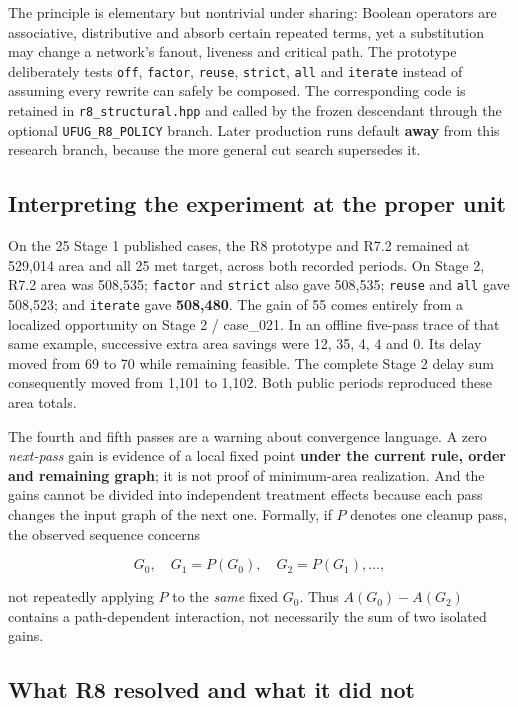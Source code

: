The principle is elementary but nontrivial under sharing: Boolean operators are associative, distributive and absorb certain repeated terms, yet a substitution may change a network's fanout, liveness and critical path. The prototype deliberately tests \texttt{off}, \texttt{factor}, \texttt{reuse}, \texttt{strict}, \texttt{all} and \texttt{iterate} instead of assuming every rewrite can safely be composed. The corresponding code is retained in \texttt{r8\_structural.hpp} and called by the frozen descendant through the optional \texttt{UFUG\_R8\_POLICY} branch. Later production runs default \textbf{away} from this research branch, because the more general cut search supersedes it.

\subsection{Interpreting the experiment at the proper unit}\label{interpreting-the-experiment-at-the-proper-unit}

On the 25 Stage 1 published cases, the R8 prototype and R7.2 remained at 529,014 area and all 25 met target, across both recorded periods. On Stage 2, R7.2 area was 508,535; \texttt{factor} and \texttt{strict} also gave 508,535; \texttt{reuse} and \texttt{all} gave 508,523; and \texttt{iterate} gave \textbf{508,480}. The gain of 55 comes entirely from a localized opportunity on Stage 2 / case\_021. In an offline five-pass trace of that same example, successive extra area savings were 12, 35, 4, 4 and 0. Its delay moved from 69 to 70 while remaining feasible. The complete Stage 2 delay sum consequently moved from 1,101 to 1,102. Both public periods reproduced these area totals.

The fourth and fifth passes are a warning about convergence language. A zero \emph{next-pass} gain is evidence of a local fixed point \textbf{under the current rule, order and remaining graph}; it is not proof of minimum-area realization. And the gains cannot be divided into independent treatment effects because each pass changes the input graph of the next one. Formally, if \(P\) denotes one cleanup pass, the observed sequence concerns

\[
G_0,\quad G_1=P(G_0),\quad G_2=P(G_1),\ldots,
\]

not repeatedly applying \(P\) to the \emph{same} fixed \(G_0\). Thus \(A(G_0)-A(G_2)\) contains a path-dependent interaction, not necessarily the sum of two isolated gains.

\subsection{What R8 resolved and what it did not}\label{what-r8-resolved-and-what-it-did-not}

